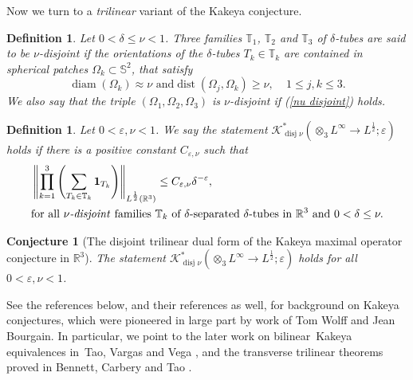 \documentclass{amsart}%
\theoremstyle{plain}
\newtheorem{conjecture}[theorem]{Conjecture}
\newtheorem{definition}[theorem]{Definition}
\numberwithin{equation}{section}
\begin{document}
Now we turn to a \emph{trilinear} variant of the Kakeya conjecture.

\begin{definition}
\label{tube disjoint}Let $0<\delta\leq\nu<1$. Three families $\mathbb{T}_{1}$,
$\mathbb{T}_{2}$ and $\mathbb{T}_{3}$ of $\delta$-tubes are said to be $\nu
$\emph{-disjoint} if the orientations of the $\delta$-tubes $T_{k}%
\in\mathbb{T}_{k}$ are contained in spherical patches $\Omega_{k}%
\subset\mathbb{S}^{2}$, that satisfy%
\begin{equation}
\operatorname*{diam}\left(  \Omega_{k}\right)  \approx\nu\text{ and
}\operatorname*{dist}\left(  \Omega_{j},\Omega_{k}\right)  \geq\nu
,\ \ \ \ \ 1\leq j,k\leq3. \label{nu disjoint}%
\end{equation}
We also say that the triple $\left(  \Omega_{1},\Omega_{2},\Omega_{3}\right)
$ is $\nu$\emph{-disjoint} if (\ref{nu disjoint}) holds.
\end{definition}

\begin{definition}
Let $0<\varepsilon,\nu<1$. We say the statement $\mathcal{K}%
_{\operatorname*{disj}\nu}^{\ast}\left(  \otimes_{3}L^{\infty}\rightarrow
L^{\frac{1}{2}};\varepsilon\right)  $ holds if there is a positive constant
$C_{\varepsilon,\nu}$ such that%
\begin{align}
&  \left\Vert \prod_{k=1}^{3}\left(  \sum_{T_{k}\in\mathbb{T}_{k}}%
\mathbf{1}_{T_{k}}\right)  \right\Vert _{L^{\frac{1}{2}}\left(  \mathbb{R}%
^{3}\right)  }\leq C_{\varepsilon,\nu}\delta^{-\varepsilon}%
,\label{tri Kak dual}\\
&  \text{for all }\nu\text{\emph{-disjoint }families }\mathbb{T}_{k}\text{ of
}\delta\text{-separated }\delta\text{-tubes in }\mathbb{R}^{3}\text{ and
}0<\delta\leq\nu.\nonumber
\end{align}

\end{definition}

\begin{conjecture}
[The disjoint trilinear dual form of the Kakeya maximal operator conjecture in
$\mathbb{R}^{3}$]\label{trilinear Kakeya}The statement $\mathcal{K}%
_{\operatorname*{disj}\nu}^{\ast}\left(  \otimes_{3}L^{\infty}\rightarrow
L^{\frac{1}{2}};\varepsilon\right)  $ holds for all $0<\varepsilon,\nu<1$.
\end{conjecture}

See the references below, and their references as well, for background on
Kakeya conjectures, which were pioneered in large part by work of Tom Wolff
and Jean Bourgain. In particular, we point to the later work on
bilinear\ Kakeya equivalences in\ Tao, Vargas and Vega \cite{TaVaVe}, and the
transverse trilinear theorems proved in Bennett, Carbery and Tao \cite{BeCaTa}.
\end{document}
